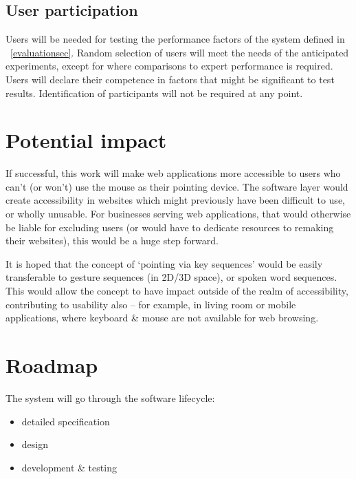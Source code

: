 \documentclass[a4paper, 11pt]{article}
\begin{document}
\subsection{User participation}
Users will be needed for testing the performance factors of the system defined in ~\cref{evaluationsec}. Random selection of users will meet the needs of the anticipated experiments, except for where comparisons to expert performance is required. Users will declare their competence in factors that might be significant to test results. Identification of participants will not be required at any point.

\section{Potential impact}
If successful, this work will make web applications more accessible to users who can't (or won't) use the mouse as their pointing device. The software layer would create accessibility in websites which might previously have been difficult to use, or wholly unusable. For businesses serving web applications, that would otherwise be liable for excluding users (or would have to dedicate resources to remaking their websites), this would be a huge step forward.

It is hoped that the concept of `pointing via key sequences' would be easily transferable to gesture sequences (in 2D/3D space), or spoken word sequences. This would allow the concept to have impact outside of the realm of accessibility, contributing to usability also -- for example, in living room or mobile applications, where keyboard \& mouse are not available for web browsing.

\section{Roadmap}
The system will go through the software lifecycle:

\begin{itemize}
\item detailed specification
\item design
\item development \& testing
\end{itemize}
\end{document}

